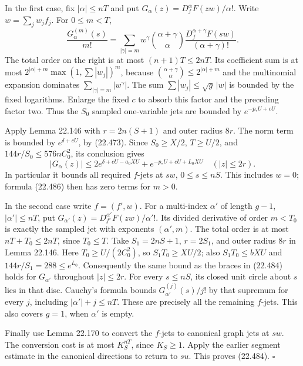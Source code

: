 \documentclass[
  11pt,
  a4paper,
]{article}
\begin{document}
In the first case, fix \(|\alpha|\le nT\) and put
\(G_\alpha(z)=D_f^\alpha F(zw)/\alpha!\). Write \(w=\sum_jw_jf_j\). For
\(0\le m<T\), \[
 \frac{G_\alpha^{(m)}(s)}{m!}
  =\sum_{|\gamma|=m}w^\gamma
       \binom{\alpha+\gamma}{\alpha}
       \frac{D_f^{\alpha+\gamma}F(sw)}{(\alpha+\gamma)!}.
 \tag{22.486}
\] The total order on the right is at most \((n+1)T\le2nT\). Its
coefficient sum is at most \(2^{|\alpha|+m}\max(1,\sum|w_j|)^m\),
because \(\binom{\alpha+\gamma}{\alpha}\le2^{|\alpha|+m}\) and the
multinomial expansion dominates \(\sum_{|\gamma|=m}|w^\gamma|\). The sum
\(\sum|w_j|\le\sqrt g\,|w|\) is bounded by the fixed logarithms. Enlarge
the fixed \(c\) to absorb this factor and the preceding factor two. Thus
the \(S_0\) sampled one-variable jets are bounded by \(e^{-p_*U+cU}\).

Apply Lemma 22.146 with \(r=2n(S+1)\) and outer radius \(8r\). The norm
term is bounded by \(e^{\delta+cU}\), by (22.473). Since \(S_0\ge X/2\),
\(T\ge U/2\), and \(144r/S_0\le576nC_0^2\), its conclusion gives \[
 |G_\alpha(z)|\le
 2e^{\delta+cU-a_0XU}
             +e^{-p_*U+cU+L_0XU}
 \quad(|z|\le2r).
 \tag{22.487}
\] In particular it bounds all required \(f\)-jets at \(sw\),
\(0\le s\le nS\). This includes \(w=0\); formula (22.486) then has zero
terms for \(m>0\).

In the second case write \(f=(f',w)\). For a multi-index \(\alpha'\) of
length \(g-1\), \(|\alpha'|\le nT\), put
\(G_{\alpha'}(z)=D_{f'}^{\alpha'}F(zw)/\alpha'!\). Its divided
derivative of order \(m<T_0\) is exactly the sampled jet with exponents
\((\alpha',m)\). The total order is at most \(nT+T_0\le2nT\), since
\(T_0\le T\). Take \(S_1=2nS+1\), \(r=2S_1\), and outer radius \(8r\) in
Lemma 22.146. Here \(T_0\ge U/(2C_0^2)\), so \(S_1T_0\ge XU/2\); also
\(S_1T_0\le bXU\) and \(144r/S_1=288\le e^{L_0}\). Consequently the same
bound as the braces in (22.484) holds for \(G_{\alpha'}\) throughout
\(|z|\le2r\). For every \(s\le nS\), its closed unit circle about \(s\)
lies in that disc. Cauchy's formula bounds \(G_{\alpha'}^{(j)}(s)/j!\)
by that supremum for every \(j\), including \(|\alpha'|+j\le nT\). These
are precisely all the remaining \(f\)-jets. This also covers \(g=1\),
when \(\alpha'\) is empty.

Finally use Lemma 22.170 to convert the \(f\)-jets to canonical graph
jets at \(sw\). The conversion cost is at most \(K_S^{nT}\), since
\(K_S\ge1\). Apply the earlier segment estimate in the canonical
directions to return to \(su\). This proves (22.484). \(\square\)
\end{document}
